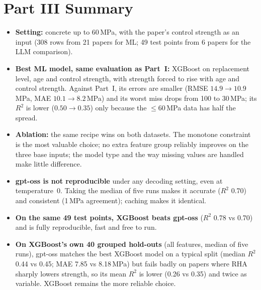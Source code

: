 \documentclass[11pt]{article}
\newcommand{\R}{$R^2$}
\begin{document}
\section{Part III Summary}
\label{sec:p3-summary}
\begin{itemize}\itemsep3pt
  \item \textbf{Setting:} concrete up to 60\,MPa, with the paper's control strength as an
        input (308 rows from 21 papers for ML; 49 test points from 6 papers for the
        LLM comparison).
  \item \textbf{Best ML model, same evaluation as Part~I:} XGBoost on replacement level,
        age and control strength, with strength forced to rise with age and control
        strength. Against Part~I, its errors are smaller (RMSE $14.9\to10.9$\,MPa, MAE
        $10.1\to8.2$\,MPa) and its worst miss drops from 100 to 30\,MPa; its \R{} is lower
        ($0.50\to0.35$) only because the $\leq60$\,MPa data has half the spread.
  \item \textbf{Ablation:} the same recipe wins on both datasets. The monotone constraint
        is the most valuable choice; no extra feature group reliably improves on the three
        base inputs; the model type and the way missing values are handled make little
        difference.
  \item \textbf{gpt-oss is not reproducible} under any decoding setting, even at
        temperature~0. Taking the median of five runs makes it accurate (\R{} 0.70) and
        consistent (1\,MPa agreement); caching makes it identical.
  \item \textbf{On the same 49 test points, XGBoost beats gpt-oss} (\R{} 0.78 vs 0.70) and
        is fully reproducible, fast and free to run.
  \item \textbf{On XGBoost's own 40 grouped hold-outs} (all features, median of five
        runs), gpt-oss matches the best XGBoost model on a typical split (median \R{}
        0.44 vs 0.45; MAE 7.85 vs 8.18\,MPa) but fails badly on papers where RHA
        sharply lowers strength, so its mean \R{} is lower (0.26 vs 0.35) and twice as
        variable. XGBoost remains the more reliable choice.
\end{itemize}
\end{document}
